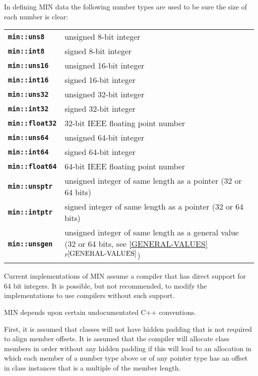 \documentclass[12pt]{article}
\makeatletter
\newcommand{\ttindex}[1]{\index{#1@{\tt #1}}}
\newcommand{\minkey}[1]%
           {{\tt \bf min::#1}\ttindex{min::#1}\ttindex{#1}}
\newcommand{\itemref}[1]{\ref{#1}$^{p\pageref{#1}}$}
\newcommand{\LABEL}[1]{\label{#1}}
\makeatother
\begin{document}
In defining MIN data the following number types are used to be sure
the size of each number is clear:
\begin{center}
\begin{tabular}{l@{~~~~~}p{4.5in}}
\minkey{uns8}	& unsigned 8-bit integer \\
\minkey{int8}	& signed 8-bit integer \\
\minkey{uns16}	& unsigned 16-bit integer \\
\minkey{int16}	& signed 16-bit integer \\
\minkey{uns32}	& unsigned 32-bit integer \\
\minkey{int32}	& signed 32-bit integer \\
\minkey{float32}	& 32-bit IEEE floating point number \\
\minkey{uns64}	& unsigned 64-bit integer \\
\minkey{int64}	& signed 64-bit integer \\
\minkey{float64}	& 64-bit IEEE floating point number \\
\minkey{unsptr}	& unsigned integer of same length as a pointer (32 or 64 bits)
                  \\
\minkey{intptr}	& signed integer of same length as a pointer (32 or 64 bits)
                  \\
\minkey{unsgen}	& unsigned integer of same length as a general value
                  (32 or 64 bits, see \itemref{GENERAL-VALUES})
                  \\
\end{tabular}
\end{center}%
\LABEL{MIN::UNS8}%
\LABEL{MIN::INT8}%
\LABEL{MIN::UNS16}%
\LABEL{MIN::INT16}%
\LABEL{MIN::UNS32}%
\LABEL{MIN::INT32}%
\LABEL{MIN::FLOAT32}%
\LABEL{MIN::UNS64}%
\LABEL{MIN::INT64}%
\LABEL{MIN::FLOAT64}%
\LABEL{MIN::UNSPTR}%
\LABEL{MIN::INTPTR}%
\LABEL{MIN::UNSGEN}%
\label{INT}%
\label{UNS}

Current implementations of MIN assume a compiler that has
direct support for 64 bit integers.  It is possible, but not recommended,
to modify the implementations to use compilers without such support.

MIN depends upon certain undocumentated C++ conventions.

First, it is assumed that classes will not have hidden
padding that is not required to align member offsets.
It is assumed that the compiler will allocate class members
in order without any hidden padding if this will lead to
an allocation in which each member of a number type above or
of any pointer type has an offset in class instances
that is a multiple of the member length.
\end{document}
